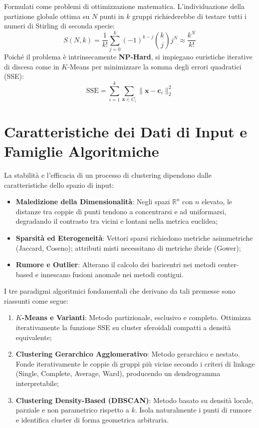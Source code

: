 \begin{enumerate}
    Formulati come problemi di ottimizzazione matematica. L'individuazione della partizione globale ottima su $N$ punti in $k$ gruppi richiederebbe di testare tutti i numeri di Stirling di seconda specie:
    \begin{equation}
        S(N, k) = \frac{1}{k!} \sum_{j=0}^k (-1)^{k-j} \binom{k}{j} j^N \approx \frac{k^N}{k!}
    \end{equation}
    Poiché il problema è intrinsecamente \textbf{NP-Hard}, si impiegano euristiche iterative di discesa come in $K$-Means per minimizzare la somma degli errori quadratici (SSE):
    \begin{equation}
        \text{SSE} = \sum_{i=1}^k \sum_{\mathbf{x} \in C_i} \|\mathbf{x} - \mathbf{c}_i\|_2^2
    \end{equation}
\end{enumerate}

\FloatBarrier
\section{Caratteristiche dei Dati di Input e Famiglie Algoritmiche}
\label{sec:dm-data-characteristics-algorithms}

La stabilità e l'efficacia di un processo di clustering dipendono dalle caratteristiche dello spazio di input:
\begin{itemize}
    \item \textbf{Maledizione della Dimensionalità}: Negli spazi $\mathbb{R}^n$ con $n$ elevato, le distanze tra coppie di punti tendono a concentrarsi e ad uniformarsi, degradando il contrasto tra vicini e lontani nella metrica euclidea;
    \item \textbf{Sparsità ed Eterogeneità}: Vettori sparsi richiedono metriche asimmetriche (Jaccard, Coseno); attributi misti necessitano di metriche ibride (Gower);
    \item \textbf{Rumore e Outlier}: Alterano il calcolo dei baricentri nei metodi center-based e innescano fusioni anomale nei metodi contigui.
\end{itemize}

I tre paradigmi algoritmici fondamentali che derivano da tali premesse sono riassunti come segue:
\begin{enumerate}
    \item \textbf{$K$-Means e Varianti}: Metodo partizionale, esclusivo e completo. Ottimizza iterativamente la funzione SSE su cluster sferoidali compatti a densità equivalente;
    \item \textbf{Clustering Gerarchico Agglomerativo}: Metodo gerarchico e nestato. Fonde iterativamente le coppie di gruppi più vicine secondo i criteri di linkage (Single, Complete, Average, Ward), producendo un dendrogramma interpretabile;
    \item \textbf{Clustering Density-Based (DBSCAN)}: Metodo basato su densità locale, parziale e non parametrico rispetto a $k$. Isola naturalmente i punti di rumore e identifica cluster di forma geometrica arbitraria.
\end{enumerate}
